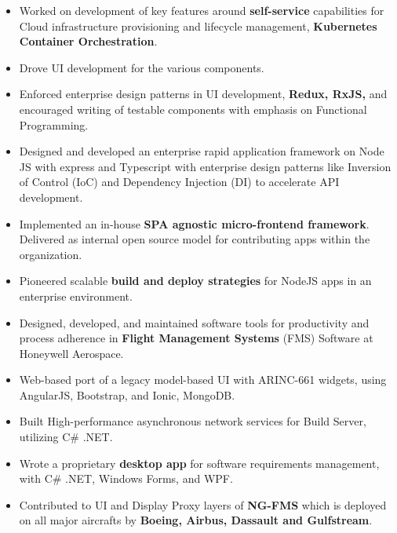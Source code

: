 \documentclass[10pt,a4paper,ragged2e,withhyper]{altacv}
\begin{document}
\begin{paracol}{2}
\begin{itemize}
  \item Worked on development of key features around \textbf{self-service} capabilities for Cloud infrastructure provisioning and lifecycle management, \textbf{Kubernetes Container Orchestration}.
  \item Drove UI development for the various components.
  \item Enforced enterprise design patterns in UI development, \textbf{Redux, RxJS,} and encouraged writing of testable components with emphasis on Functional Programming.
  \item Designed and developed an enterprise rapid application framework on Node JS with express and Typescript with enterprise design patterns like Inversion of Control (IoC) and Dependency Injection (DI) to accelerate API development.
  \item Implemented an in-house \textbf{SPA agnostic micro-frontend framework}. Delivered as internal open source model for contributing apps within the organization.
  \item Pioneered scalable \textbf{build and deploy strategies} for NodeJS apps in an enterprise environment.
\end{itemize}

\divider

\begin{itemize}
  \item Designed, developed, and maintained software tools for productivity and process adherence in \textbf{Flight Management Systems} (FMS) Software at Honeywell Aerospace.
  \item Web-based port of a legacy model-based UI with ARINC-661 widgets, using AngularJS, Bootstrap, and Ionic, MongoDB.
  \item Built High-performance asynchronous network services for Build Server, utilizing C\# .NET.
  \item Wrote a proprietary \textbf{desktop app} for software requirements management, with C\# .NET, Windows Forms, and WPF.
  \item Contributed to UI and Display Proxy layers of \textbf{NG-FMS} which is deployed on all major aircrafts by \textbf{Boeing, Airbus, Dassault and Gulfstream}.
\end{itemize}


\end{paracol}
\end{document}
